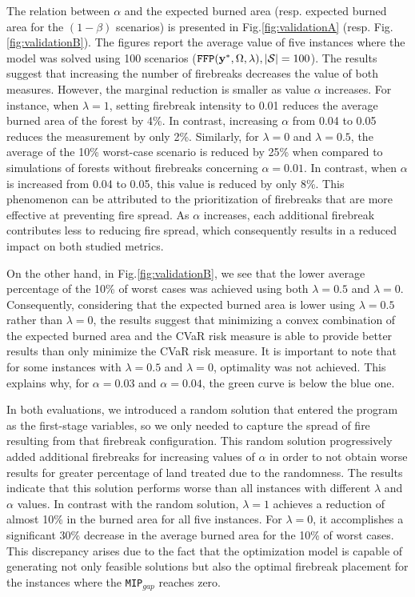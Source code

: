 \documentclass[a4paper,fleqn]{cas-sc}
\begin{document}
The relation between $\alpha$ and the expected burned area (resp. expected burned area for the $(1-\beta)$ scenarios) is presented in Fig.\:\ref{fig:validationA} (resp. Fig.\:\ref{fig:validationB}). The figures report the average value of five instances where the model was solved using 100 scenarios ($\texttt{FFP}(\vb{y}^*,\Omega, \lambda), \vert \mathcal{S} \rvert = 100$). The results suggest that increasing the number of firebreaks decreases the value of both measures. However, the marginal reduction is smaller as value $\alpha$ increases. For instance, when $\lambda = 1$, setting firebreak intensity to 0.01 reduces the average burned area of the forest by 4\%. In contrast, increasing $\alpha$ from 0.04 to 0.05 reduces the measurement by only 2\%. Similarly, for $\lambda = 0$ and $\lambda = 0.5$, the average of the 10\% worst-case scenario is reduced by 25\% when compared to simulations of forests without firebreaks concerning $\alpha = 0.01$. In contrast, when $\alpha$ is increased from 0.04 to 0.05, this value is reduced by only 8\%. This phenomenon can be attributed to the prioritization of firebreaks that are more effective at preventing fire spread. As $\alpha$ increases, each additional firebreak contributes less to reducing fire spread, which consequently results in a reduced impact on both studied metrics. 

On the other hand, in Fig.\:\ref{fig:validationB}, we see that the lower average percentage of the 10\% of worst cases was achieved using both $\lambda = 0.5$ and $\lambda = 0$. Consequently, considering that the expected burned area is lower using $\lambda = 0.5$ rather than $\lambda = 0$, the results suggest that minimizing a convex combination of the expected burned area and the CVaR risk measure is able to provide better results than only minimize the CVaR risk measure. It is important to note that for some instances with $\lambda = 0.5$ and $\lambda = 0$, optimality was not achieved. This explains why, for $\alpha = 0.03$ and $\alpha = 0.04$, the green curve is below the blue one.

In both evaluations, we introduced a random solution that entered the program as the first-stage variables, so we only needed to capture the spread of fire resulting from that firebreak configuration. This random solution progressively added additional firebreaks for increasing values of $\alpha$ in order to not obtain worse results for greater percentage of land treated due to the randomness. The results indicate that this solution performs worse than all instances with different $\lambda$ and $\alpha$ values. In contrast with the random solution, $\lambda = 1$ achieves a reduction of almost 10\% in the burned area for all five instances. For $\lambda = 0$, it accomplishes a significant 30\% decrease in the average burned area for the 10\% of worst cases. This discrepancy arises due to the fact that the optimization model is capable of generating not only feasible solutions but also the optimal firebreak placement for the instances where the \texttt{MIP$_{gap}$} reaches zero.
\end{document}

